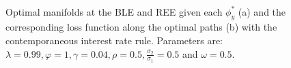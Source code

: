     \begin{figure}
    \begin{center}
        \mbox{\quad
        }
   \end{center}
   \caption{\label{optbench} Optimal manifolds at the BLE and REE given each $\phi_y^*$ (a) and the corresponding loss function along the optimal paths (b) with the contemporaneous interest rate rule. Parameters are: $\lambda=0.99, \varphi=1, \gamma=0.04, \rho=0.5,
\frac{\sigma_2}{\sigma_1}=0.5$ and $\omega=0.5$.}
    \end{figure}

